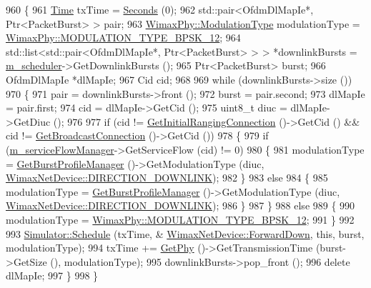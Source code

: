 \begin{DoxyCode}
960 \{
961   \hyperlink{namespacens3_1_1TracedValueCallback_a7ffd3e7c142ffe7c8a1d2db9b8de38ec}{Time} txTime = \hyperlink{group__timecivil_ga33c34b816f8ff6628e33d5c8e9713b9e}{Seconds} (0);
962   std::pair<OfdmDlMapIe*, Ptr<PacketBurst> > pair;
963   \hyperlink{classns3_1_1WimaxPhy_a044c5d8a48ca992c39c2a946f6e755fa}{WimaxPhy::ModulationType} modulationType = 
      \hyperlink{classns3_1_1WimaxPhy_a044c5d8a48ca992c39c2a946f6e755faaef0b78541d9b66d4e85780131e665028}{WimaxPhy::MODULATION\_TYPE\_BPSK\_12};
964   std::list<std::pair<OfdmDlMapIe*, Ptr<PacketBurst> > > *downlinkBursts = 
      \hyperlink{classns3_1_1BaseStationNetDevice_ae25a05b8fbaed29fd59277f928683a16}{m\_scheduler}->GetDownlinkBursts ();
965   Ptr<PacketBurst> burst;
966   OfdmDlMapIe *dlMapIe;
967   Cid cid;
968 
969   \textcolor{keywordflow}{while} (downlinkBursts->size ())
970     \{
971       pair = downlinkBursts->front ();
972       burst = pair.second;
973       dlMapIe = pair.first;
974       cid = dlMapIe->GetCid ();
975       uint8\_t diuc = dlMapIe->GetDiuc ();
976 
977       \textcolor{keywordflow}{if} (cid != \hyperlink{classns3_1_1WimaxNetDevice_a2d1cf9aa6bcb809f54f58432f049853f}{GetInitialRangingConnection} ()->GetCid () && cid != 
      \hyperlink{classns3_1_1WimaxNetDevice_a11d2c7bbd695e2c845a821ec15baa2aa}{GetBroadcastConnection} ()->GetCid ())
978         \{
979           \textcolor{keywordflow}{if} (\hyperlink{classns3_1_1BaseStationNetDevice_a7ba16e6369f37b75fd026bf70561c6e9}{m\_serviceFlowManager}->GetServiceFlow (cid) != 0)
980             \{
981               modulationType = \hyperlink{classns3_1_1WimaxNetDevice_adc0798ce5d154658179fcecaf5bc602f}{GetBurstProfileManager} ()->GetModulationType (diuc, 
      \hyperlink{classns3_1_1WimaxNetDevice_a194b6cf7eb59582328eb2531dc9ed884a5873dae7c36e21d904ae2d6922835e89}{WimaxNetDevice::DIRECTION\_DOWNLINK});
982             \}
983           \textcolor{keywordflow}{else}
984             \{
985               modulationType = \hyperlink{classns3_1_1WimaxNetDevice_adc0798ce5d154658179fcecaf5bc602f}{GetBurstProfileManager} ()->GetModulationType (diuc, 
      \hyperlink{classns3_1_1WimaxNetDevice_a194b6cf7eb59582328eb2531dc9ed884a5873dae7c36e21d904ae2d6922835e89}{WimaxNetDevice::DIRECTION\_DOWNLINK});
986             \}
987         \}
988       \textcolor{keywordflow}{else}
989         \{
990           modulationType = \hyperlink{classns3_1_1WimaxPhy_a044c5d8a48ca992c39c2a946f6e755faaef0b78541d9b66d4e85780131e665028}{WimaxPhy::MODULATION\_TYPE\_BPSK\_12};
991         \}
992 
993       \hyperlink{classns3_1_1Simulator_a671882c894a08af4a5e91181bf1eec13}{Simulator::Schedule} (txTime, &
      \hyperlink{classns3_1_1WimaxNetDevice_af484194cd18f49cb532794513636f2b9}{WimaxNetDevice::ForwardDown}, \textcolor{keyword}{this}, burst, modulationType);
994       txTime += \hyperlink{classns3_1_1WimaxNetDevice_a81c1f9d43acfc9cd5d642b784102a21f}{GetPhy} ()->GetTransmissionTime (burst->GetSize (), modulationType);
995       downlinkBursts->pop\_front ();
996       \textcolor{keyword}{delete} dlMapIe;
997     \}
998 \}
\end{DoxyCode}


